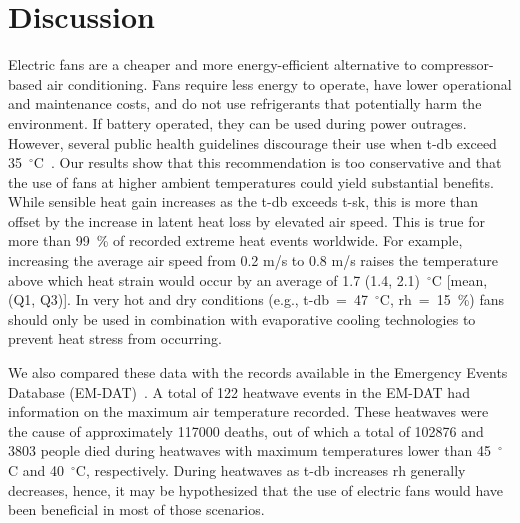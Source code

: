 
\section{Discussion}\label{sec:discussion}

Electric fans are a cheaper and more energy-efficient alternative to compressor-based air conditioning.
Fans require less energy to operate, have lower operational and maintenance costs, and do not use refrigerants that potentially harm the environment. 
If battery operated, they can be used during power outrages. 
However, several public health guidelines discourage their use when \acf{t-db} exceed 35~$^{\circ}$C~\cite{WMO2015}.
Our results show that this recommendation is too conservative and that the use of fans at higher ambient temperatures could yield substantial benefits.
While sensible heat gain increases as the \ac{t-db} exceeds \acf{t-sk}, this is more than offset by the increase in latent heat loss by elevated air speed. 
This is true for more than 99~\% of recorded extreme heat events worldwide.
For example, increasing the average air speed from 0.2 m/s to 0.8 m/s raises the temperature above which heat strain would occur by an average of 1.7 (1.4, 2.1)~$^{\circ}$C [mean, (Q1, Q3)].
In very hot and dry conditions (e.g., \ac{t-db}~=~47~$^{\circ}$C, \ac{rh}~=~15~\%) fans should only be used in combination with evaporative cooling technologies to prevent heat stress from occurring.

We also compared these data with the records available in the Emergency Events Database (EM-DAT)~\cite{EMDATThe70:online}.
A total of 122 heatwave events in the EM-DAT had information on the maximum air temperature recorded.
These heatwaves were the cause of approximately 117000 deaths, out of which a total of 102876 and 3803 people died during heatwaves with maximum temperatures lower than 45~$^{\circ}$C and 40~$^{\circ}$C, respectively.
During heatwaves as \ac{t-db} increases \ac{rh} generally decreases, hence, it may be hypothesized that the use of electric fans would have been beneficial in most of those scenarios.

